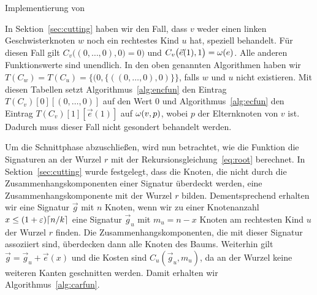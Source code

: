 \begin{algorithm}
    \caption{Implementierung von }\label{alg:ecfun}
    \begin{algorithmic}[1]
             
                \Return {}
            \Else
            \EndIf
        \EndFunction
    \end{algorithmic}
\end{algorithm}

\begin{rem}
    In Sektion~\ref{sec:cutting} haben wir den Fall, dass $v$ weder einen linken Geschwisterknoten $w$ noch ein rechtestes Kind $u$ hat, speziell behandelt.
    Für diesen Fall gilt $C_v\big((0,\ldots,0), 0\big) = 0)$ und $C_v\big(\vec{e}(1), 1\big) = \omega(e)$. 
    Alle anderen Funktionswerte sind unendlich.
    In den oben genannten Algorithmen haben wir $T(C_w) = T(C_u) = \big\{(0, \{((0, \ldots, 0), 0)\} \big\}$, falls $w$ und $u$ nicht existieren.
    Mit diesen Tabellen setzt Algorithmus~\ref{alg:encfun} den Eintrag $T(C_v)[0][(0,\ldots, 0)]$ auf den Wert $0$ und Algorithmus~\ref{alg:ecfun} den Eintrag $T(C_v)[1][\vec{e}(1)]$ auf $\omega(v,p)$, wobei $p$ der Elternknoten von $v$ ist.
    Dadurch muss dieser Fall nicht gesondert behandelt werden.
\end{rem}

Um die Schnittphase abzuschließen, wird nun betrachtet, wie die Funktion \mbox{\carfun{}} die Signaturen an der Wurzel $r$ mit der Rekursionsgleichung~\eqref{eq:root} berechnet.
In Sektion~\ref{sec:cutting} wurde festgelegt, dass die Knoten, die nicht durch die Zusammenhangskomponenten einer Signatur überdeckt werden, eine Zusammenhangskomponente mit der Wurzel $r$ bilden.
Dementsprechend erhalten wir eine Signatur $\vec{g}$ mit $n$ Knoten, wenn wir zu einer Knotenanzahl $x \leq (1+\varepsilon)\lceil n/k\rceil$ eine Signatur $\vec{g}_u$ mit $m_u = n - x$ Knoten am rechtesten Kind $u$ der Wurzel $r$ finden.
Die Zusammenhangskomponenten, die mit dieser Signatur assoziiert sind, überdecken dann alle Knoten des Baums.
Weiterhin gilt $\vec{g} = \vec{g}_u + \vec{e}(x)$ und die Kosten sind $C_u(\vec{g}_u, m_u)$, da an der Wurzel keine weiteren Kanten geschnitten werden.
Damit erhalten wir Algorithmus~\ref{alg:carfun}.

